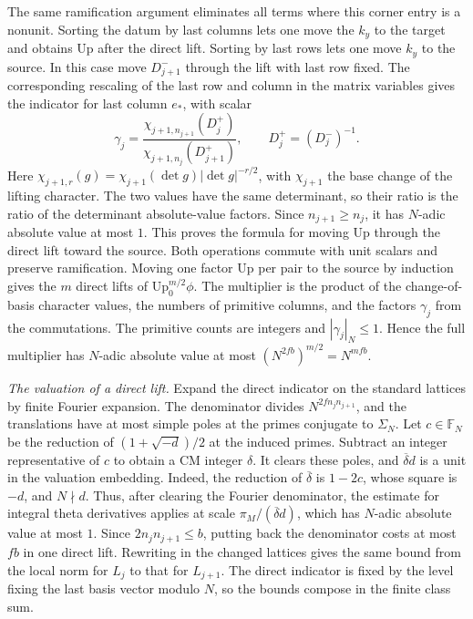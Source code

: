 The same ramification argument eliminates all terms where this
corner entry is a nonunit. Sorting the datum by last columns lets
one move the \(k_y\) to the target and obtains \(\mathrm{Up}\) after
the direct lift. Sorting by last rows lets one move \(k_y\) to the source.
In this case move \(D_{j+1}^-\) through the lift with last row fixed.
The corresponding rescaling of the last row and column in the matrix
variables gives the indicator for last column \(e_*\), with scalar
\[
 \gamma_j
   =\frac{\chi_{j+1,n_{j+1}}(D_j^+)}
           {\chi_{j+1,n_j}(D_{j+1}^+)},\qquad D_j^+=(D_j^-)^{-1}.
\]
Here \(\chi_{j+1,r}(g)=\chi_{j+1}(\det g)|\det g|^{-r/2}\), with
\(\chi_{j+1}\) the base change of the lifting character.
The two values have the same determinant, so their ratio is the
ratio of the determinant absolute-value factors. Since
\(n_{j+1}\ge n_j\), it has \(N\)-adic absolute value at most \(1\).
This proves the formula for moving \(\mathrm{Up}\) through the direct
lift toward the source. Both operations commute with unit scalars and
preserve ramification. Moving one factor \(\mathrm{Up}\) per pair to
the source by induction gives the \(m\) direct lifts of
\(\mathrm{Up}_0^{m/2}\phi\). The multiplier is the product of the
change-of-basis character values, the numbers of primitive columns,
and the factors \(\gamma_j\) from the commutations.
The primitive counts are integers and \(|\gamma_j|_N\le1\).
Hence the full multiplier has \(N\)-adic absolute value at most
\((N^{2fb})^{m/2}=N^{mfb}\).

\emph{The valuation of a direct lift.}
Expand the direct indicator on the standard lattices by finite Fourier
expansion. The denominator divides \(N^{2fn_jn_{j+1}}\), and the
translations have at most simple poles at the primes conjugate to
\(\Sigma_N\). Let \(c\in\mathbb F_N\) be the reduction of
\((1+\sqrt{-d})/2\) at the induced primes. Subtract an integer
representative of \(c\) to obtain a CM integer \(\delta\).
It clears these poles, and \(\overline\delta d\) is a unit in the
valuation embedding. Indeed, the reduction of \(\overline\delta\)
is \(1-2c\), whose square is \(-d\), and \(N\nmid d\).
Thus, after clearing the Fourier denominator, the estimate for
integral theta derivatives applies at scale \(\pi_M/(\overline\delta d)\),
which has \(N\)-adic absolute value at most \(1\).
Since \(2n_jn_{j+1}\le b\), putting back the denominator costs at most
\(fb\) in one direct lift. Rewriting in the changed lattices gives the
same bound from the local norm for \(L_j\) to that for \(L_{j+1}\).
The direct indicator is fixed by the level fixing the last basis
vector modulo \(N\), so the bounds compose in the finite class sum.

